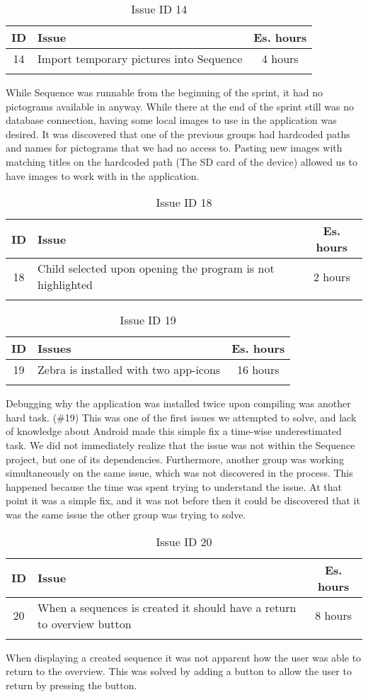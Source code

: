 \begin{longtable} { | c | p{12cm} | c | } 
\hline
	ID 	&	Issue	&		 Es. hours \\\hline
	14	& 	Import temporary pictures into Sequence	&	4 hours	\\\hline
\caption{Issue ID 14}
\label{tab:spr1_issue14}
\end{longtable}
While Sequence was runnable from the beginning of the sprint, it had no pictograms available in anyway. While there at the end of the sprint still was no database connection, having some local images to use in the application was desired. It was discovered that one of the previous groups had hardcoded paths and names for pictograms that we had no access to. Pasting new images with matching titles on the hardcoded path (The SD card of the device) allowed us to have images to work with in the application.

\begin{longtable} { | c | p{12cm} | c | } 
\hline
	ID 	&	Issue	&		 Es. hours \\\hline
	18	& 	Child selected upon opening the program is not highlighted	&	2 hours	\\\hline
\caption{Issue ID 18}
\label{tab:spr1_issue18}
\end{longtable}



\begin{longtable} { | c | p{12cm} | c | } 
\hline
	ID 	&	Issues	&		 Es. hours \\\hline
	19	& 	Zebra is installed with two app-icons	&	16 hours	\\\hline
\caption{Issue ID 19}
\label{tab:spr1_issue19}
\end{longtable}
Debugging why the application was installed twice upon compiling was another hard task. (\#19) This was one of the first issues we attempted to solve, and lack of knowledge about Android made this simple fix a time-wise underestimated task. We did not immediately realize that the issue was not within the Sequence project, but one of its dependencies. Furthermore, another group was working simultaneously on the same issue, which was not discovered in the process. This happened because the time was spent trying to understand the issue. At that point it was a simple fix, and it was not before then it could be discovered that it was the same issue the other group was trying to solve.

\begin{longtable} { | c | p{12cm} | c | } 
\hline
	ID 	&	Issue	&		 Es. hours \\\hline
	20	& 	When a sequences is created it should have a return to overview button	&	8 hours	\\\hline
\caption{Issue ID 20}
\label{tab:spr1_issue20}
\end{longtable}
When displaying a created sequence it was not apparent how the user was able to return to the overview. This was solved by adding a button to allow the user to return by pressing the button.
